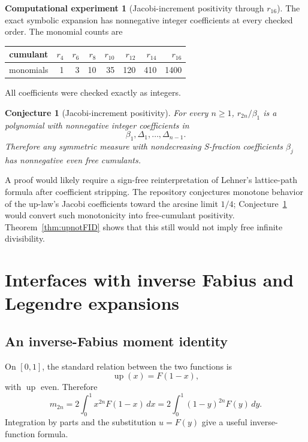 \documentclass[11pt]{article}
\newtheorem{conjecture}[theorem]{Conjecture}
\theoremstyle{definition}
\newtheorem{experiment}[theorem]{Computational experiment}
\newcommand{\Up}{\operatorname{up}}
\begin{document}
\begin{experiment}[Jacobi-increment positivity through \(r_{16}\)]\label{exp:jacobiincrements}
The exact symbolic expansion has nonnegative integer coefficients at every checked order. The monomial counts are
\begin{center}
\begin{tabular}{c|rrrrrrr}
\toprule
cumulant & \(r_4\)&\(r_6\)&\(r_8\)&\(r_{10}\)&\(r_{12}\)&\(r_{14}\)&\(r_{16}\)\\
\midrule
monomials &1&3&10&35&120&410&1400\\
\bottomrule
\end{tabular}
\end{center}
All coefficients were checked exactly as integers.
\end{experiment}

\begin{conjecture}[Jacobi-increment positivity]\label{conj:jacobiincrements}
For every \(n\ge1\), \(r_{2n}/\beta_1\) is a polynomial with nonnegative integer coefficients in
\[
\beta_1,\Delta_1,\ldots,\Delta_{n-1}.
\]
Therefore any symmetric measure with nondecreasing S-fraction coefficients \(\beta_j\) has nonnegative even free cumulants.
\end{conjecture}

A proof would likely require a sign-free reinterpretation of Lehner's lattice-path formula after coefficient stripping. The repository conjectures monotone behavior of the up-law's Jacobi coefficients toward the arcsine limit \(1/4\); Conjecture~\ref{conj:jacobiincrements} would convert such monotonicity into free-cumulant positivity. Theorem~\ref{thm:upnotFID} shows that this still would not imply free infinite divisibility.

\section{Interfaces with inverse Fabius and Legendre expansions}
\subsection{An inverse-Fabius moment identity}
On \([0,1]\), the standard relation between the two functions is
\begin{equation}\label{eq:upF}
\Up(x)=F(1-x),
\end{equation}
with \(\Up\) even. Therefore
\begin{equation}\label{eq:momentF}
m_{2n}=2\int_0^1x^{2n}F(1-x)\,dx
      =2\int_0^1(1-y)^{2n}F(y)\,dy.
\end{equation}
Integration by parts and the substitution \(u=F(y)\) give a useful inverse-function formula.
\end{document}
